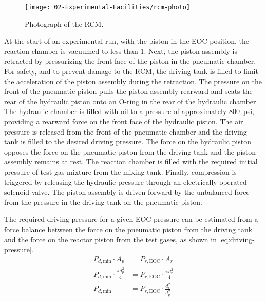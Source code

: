 \documentclass[../main.tex]{subfiles}
\begin{document}

\begin{figure}
\texttt{[image: 02-Experimental-Facilities/rcm-photo]}
\caption{Photograph of the RCM.}\label{fig:rcm-photo}
\end{figure}

At the start of an experimental run, with the piston in the
EOC position, the reaction chamber is vacuumed to less
than \SI{1}{\torr}. Next, the piston assembly is retracted by pressurizing
the front face of the piston in the pneumatic chamber.
For safety, and to prevent damage to the RCM, the driving tank is
filled to limit the acceleration of the piston assembly during the
retraction.
The pressure on the front of the pneumatic piston pulls the
piston assembly rearward and seats the rear of the
hydraulic piston onto an O-ring in the rear of the
hydraulic chamber. The hydraulic chamber is filled with oil to
a pressure of approximately \SI{800}{psi}, providing a rearward force on the
front face of the hydraulic piston. The air pressure is released from
the front of the pneumatic chamber and the driving tank is filled to
the desired driving pressure. The
force on the hydraulic piston opposes the force on the pneumatic piston
from the driving tank and the piston assembly remains at rest. The
reaction chamber is filled with the required initial pressure of test
gas mixture from the mixing tank. Finally, compression is triggered by
releasing the hydraulic pressure through an electrically-operated solenoid
valve. The piston assembly is driven forward by the unbalanced force from
the pressure in the driving tank on the pneumatic piston.

The required driving pressure for a given EOC pressure can be estimated
from a force balance between the force on the pneumatic piston from the
driving tank and the force on the reactor piston from the test gases,
as shown in \cref{eq:driving-pressure}.
%
\begin{subequations}
\label{eq:piston-force}
\begin{align}
    P_{d,\text{min}} \cdot A_p &= P_{r,\text{EOC}} \cdot A_r \\
    P_{d,\text{min}} \cdot \frac{\pi d_p^2}{4} &= P_{r,\text{EOC}} \cdot \frac{\pi d_r^2}{4} \\
    P_{d,\text{min}} &= P_{r,\text{EOC}} \cdot \frac{d_r^2}{d_p^2} \label{eq:driving-pressure}
\end{align}
\end{subequations}
\end{document}

